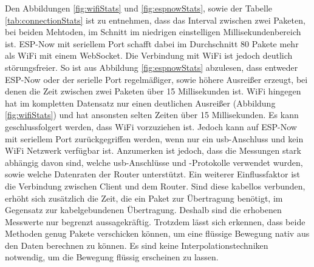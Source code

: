 Den Abbildungen \ref{fig:wifiStats} und \ref{fig:espnowStats}, sowie der Tabelle \ref{tab:connectionStats} ist zu entnehmen, dass das Interval zwischen zwei Paketen, bei beiden Mehtoden, im Schnitt im niedrigen einstelligen Millisekundenbereich ist.
ESP-Now mit seriellem Port schafft dabei im Durchschnitt 80 Pakete mehr als WiFi mit einem WebSocket.
Die Verbindung mit WiFi ist jedoch deutlich störungsfreier.
So ist aus Abbildung \ref{fig:espnowStats} abzulesen, dass entweder ESP-Now oder der serielle Port regelmäßiger, sowie höhere Ausreißer erzeugt, bei denen die Zeit zwischen zwei Paketen über 15 Millisekunden ist.
WiFi hingegen hat im kompletten Datensatz nur einen deutlichen Ausreißer (Abbildung \ref*{fig:wifiStats}) und hat ansonsten selten Zeiten über 15 Millisekunden. Es kann geschlussfolgert werden, dass WiFi vorzuziehen ist.
Jedoch kann auf ESP-Now mit seriellem Port zurückgegriffen werden, wenn nur ein \ac{usb}-Anschluss und kein WiFi Netzwerk verfügbar ist.
Anzumerken ist jedoch, dass die Messungen stark abhängig davon sind, welche \ac{usb}-Anschlüsse und -Protokolle verwendet wurden, sowie welche Datenraten der Router unterstützt.
Ein weiterer Einflussfaktor ist die Verbindung zwischen Client und dem Router.
Sind diese kabellos verbunden, erhöht sich zusätzlich die Zeit, die ein Paket zur Übertragung benötigt, im Gegensatz zur kabelgebundenen Übertragung.
Deshalb sind die erhobenen Messwerte nur begrenzt aussagekräftig.
Trotzdem lässt sich erkennen, dass beide Methoden genug Pakete verschicken können, um eine flüssige Bewegung nativ aus den Daten berechnen zu können.
Es sind keine Interpolationstechniken notwendig, um die Bewegung flüssig erscheinen zu lassen.

\newpage

